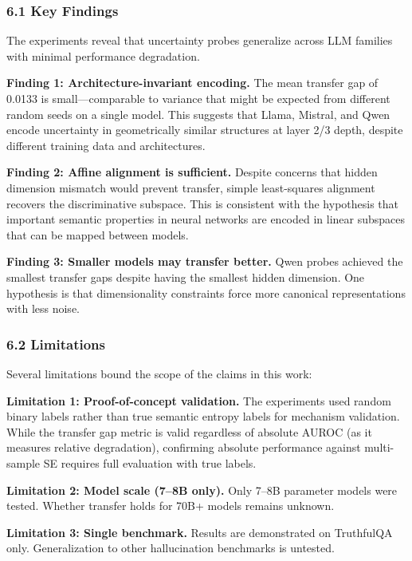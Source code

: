 
\subsubsection{6.1 Key Findings}

The experiments reveal that uncertainty probes generalize across LLM families with minimal performance degradation.

\textbf{Finding 1: Architecture-invariant encoding.} The mean transfer gap of 0.0133 is small---comparable to variance that might be expected from different random seeds on a single model. This suggests that Llama, Mistral, and Qwen encode uncertainty in geometrically similar structures at layer 2/3 depth, despite different training data and architectures.

\textbf{Finding 2: Affine alignment is sufficient.} Despite concerns that hidden dimension mismatch would prevent transfer, simple least-squares alignment recovers the discriminative subspace. This is consistent with the hypothesis that important semantic properties in neural networks are encoded in linear subspaces that can be mapped between models.

\textbf{Finding 3: Smaller models may transfer better.} Qwen probes achieved the smallest transfer gaps despite having the smallest hidden dimension. One hypothesis is that dimensionality constraints force more canonical representations with less noise.

\subsubsection{6.2 Limitations}

Several limitations bound the scope of the claims in this work:

\textbf{Limitation 1: Proof-of-concept validation.} The experiments used random binary labels rather than true semantic entropy labels for mechanism validation. While the transfer gap metric is valid regardless of absolute AUROC (as it measures relative degradation), confirming absolute performance against multi-sample SE requires full evaluation with true labels.

\textbf{Limitation 2: Model scale (7--8B only).} Only 7--8B parameter models were tested. Whether transfer holds for 70B+ models remains unknown.

\textbf{Limitation 3: Single benchmark.} Results are demonstrated on TruthfulQA only. Generalization to other hallucination benchmarks is untested.

